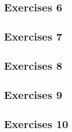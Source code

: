 \subsection{Exercises 6}

\subsection{Exercises 7}

\subsection{Exercises 8}

\subsection{Exercises 9}

\subsection{Exercises 10}









